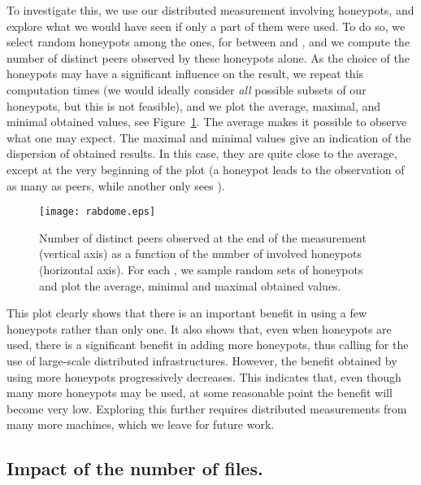 \documentclass[final,
notitlepage,
narroweqnarray,
	inline,
	twoside,
]{ieee}
\newcommand{\noteperso}[1]{\begin{center}
 \fbox{\begin{minipage}{6cm}#1\end{minipage}}\end{center}}
\renewcommand{\noteperso}[1]{}
\begin{document}
To investigate this, we use our distributed measurement involving  honeypots, and explore what we would have seen if only a part of them were used. To do so, we select  random honeypots among the  ones, for  between  and , and we compute the number of distinct peers observed by these  honeypots alone. As the choice of the  honeypots may have a significant influence on the result, we repeat this computation  times (we would ideally consider {\em all}  possible subsets of our honeypots, but this is not feasible), and we plot the average, maximal, and minimal obtained values, see Figure~\ref{fig-nbhoneypots}. The average makes it possible to observe what one may expect. The maximal and minimal values give an indication of the dispersion of obtained results. In this case, they are quite close to the average, except at the very beginning of the plot (a honeypot leads to the observation of as many as  peers, while another only sees ).

\noteperso{ML: figure~\ref{fig-nbhoneypots} : ca se termine par une droite ou pas ? moi j'ai dit que non dans le texte, mais a voir ; tracer un fit ? tracer le NB de nouveaux peers par honeypot ?}

\begin{figure}[h!]
\centering
\texttt{[image: rabdome.eps]}
\caption{Number of distinct peers observed at the end of the
  measurement (vertical axis) as a function of the number  of
  involved honeypots (horizontal axis). For each , we sample 
  random sets of  honeypots and plot the average, minimal and
  maximal obtained values.}
\label{fig-nbhoneypots}
\end{figure}

This plot clearly shows that there is an important benefit in using a few honeypots rather than only one. It also shows that, even when  honeypots are used, there is a significant benefit in adding more honeypots, thus calling for the use of large-scale distributed infrastructures. However, the benefit obtained by using more honeypots progressively decreases. This indicates that, even though many more honeypots may be used, at some reasonable point the benefit will become very low. Exploring this further requires distributed measurements from many more machines, which we leave for future work.

\subsection{Impact of the number of files.}
\label{sec-nbfiles}
\end{document}
